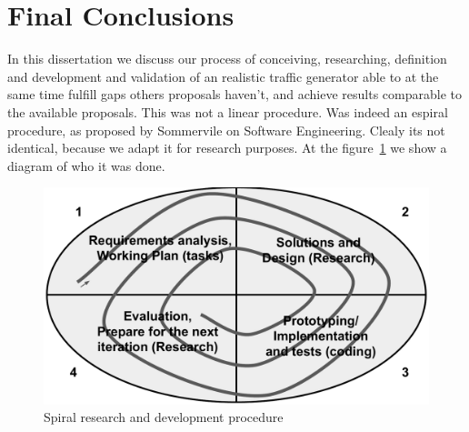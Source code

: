 



\section{Final Conclusions}


In this dissertation we discuss our process of conceiving, researching, definition and development and validation of an realistic traffic generator able to at the same time fulfill gaps others proposals haven't, and achieve results comparable to the available proposals. This was not a linear procedure. Was indeed an espiral procedure, as proposed by Sommervile on Software Engineering\cite{sommerville}. Clealy its not identical, because we adapt it for research purposes. At the figure~\ref{fig:spiral} we show a diagram of who  it was done. 

\begin{figure}[!ht]
	\centering
	\includegraphics[scale=0.4]{figures/ch6/spiral}
	\caption{Spiral research and development procedure}
	\label{fig:spiral}
\end{figure}


